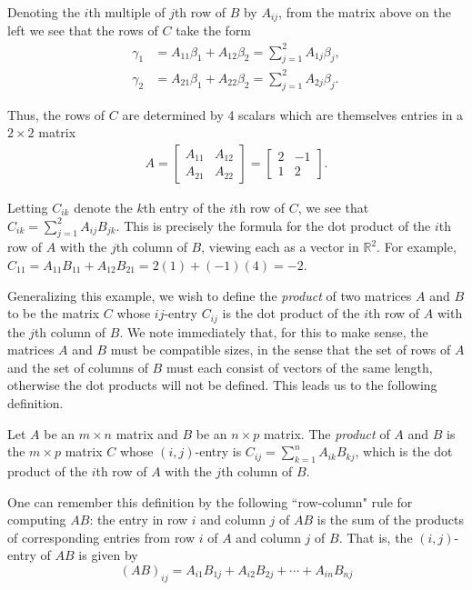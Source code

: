 \documentclass[12pt,letterpaper,reqno]{article}
\numberwithin{equation}{section}
\newcommand{\R}{\ensuremath{\mathbb R}}
\newcommand{\ti}[1]{\textit{#1}}
\begin{document}
Denoting the $i$th multiple of $j$th row of $B$ by $A_{ij}$, from the matrix above on the left we see that the rows of $C$ take the form
\begin{align*}
	\gamma_1&=A_{11}\beta_1+A_{12}\beta_2=\sum_{j=1}^2A_{1j}\beta_j, \\
	\gamma_2&=A_{21}\beta_1+A_{22}\beta_2=\sum_{j=1}^2A_{2j}\beta_j.
\end{align*}

Thus, the rows of $C$ are determined by 4 scalars which are themselves entries in a $2 \times 2$ matrix
\begin{align*}
	A=\begin{bmatrix}
		A_{11} & A_{12} \\
		A_{21} & A_{22}
	\end{bmatrix}=\begin{bmatrix}
		2 & -1 \\
		1 & 2
	\end{bmatrix}.
\end{align*}

Letting $C_{ik}$ denote the $k$th entry of the $i$th row of $C$, we see that $C_{ik}=\sum_{j=1}^2A_{ij}B_{jk}$. This is precisely the formula for the dot product of the $i$th row of $A$ with the $j$th column of $B$, viewing each as a vector in $\R^2$. For example, $C_{11}=A_{11}B_{11}+A_{12}B_{21}=2(1)+(-1)(4)=-2$.

Generalizing this example, we wish to define the \emph{product} of two matrices $A$ and $B$ to be the matrix $C$ whose $ij$-entry $C_{ij}$ is the dot product of the $i$th row of $A$ with the $j$th column of $B$. We note immediately that, for this to make sense, the matrices $A$ and $B$ must be compatible sizes, in the sense that the set of rows of $A$ and the set of columns of $B$ must each consist of vectors of the same length, otherwise the dot products will not be defined. This leads us to the following definition.

\begin{defn}\label{def:matrix_multiplication}
	Let $A$ be an $m \times n$ matrix and $B$ be an $n \times p$ matrix. The \ti{product} of $A$ and $B$ is the $m \times p$ matrix $C$ whose $(i,j)$-entry is $C_{ij}=\sum_{k=1}^n A_{ik}B_{kj}$, which is the dot product of the $i$th row of $A$ with the $j$th column of $B$.
\end{defn}

\begin{example}
	One can remember this definition by the following ``row-column" rule for computing $AB$: the entry in row $i$ and column $j$ of $AB$ is the sum of the products of corresponding entries from row $i$ of $A$ and column $j$ of $B$. That is, the $(i,j)$-entry of $AB$ is given by
\begin{equation}
	(AB)_{ij}=A_{i1}B_{1j}+A_{i2}B_{2j}+\cdots+A_{in}B_{nj}	
\end{equation}

\end{example}
\end{document}
